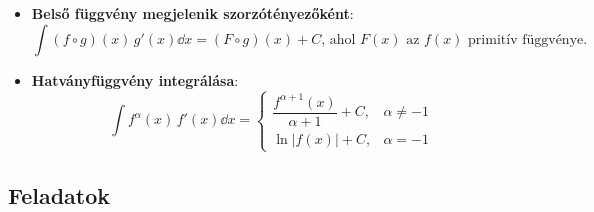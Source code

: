 \documentclass[fleqn]{szb-practice}
\begin{document}
\begin{blueBox}
  \begin{itemize}

    \item \textbf{Belső függvény megjelenik szorzótényezőként}:
          \begin{equation*}
            \int (f \circ g)(x) \, g'(x) \dd x
            = (F \circ g)(x) + C
            \text{, ahol } F(x) \text{ az } f(x) \text{ primitív függvénye.}
          \end{equation*}

    \item \textbf{Hatványfüggvény integrálása}:
          \begin{equation*}
            \int f^{\alpha} (x) \, f'(x) \dd x = \begin{cases}
              \dfrac{f^{\alpha + 1} (x)}{\alpha + 1} + C, & \alpha \neq -1
              \\[2mm]
              \ln |f(x)| + C,                             & \alpha = -1
            \end{cases}
          \end{equation*}
  \end{itemize}
\end{blueBox}

\clearpage
\subsection{Feladatok}
\end{document}
